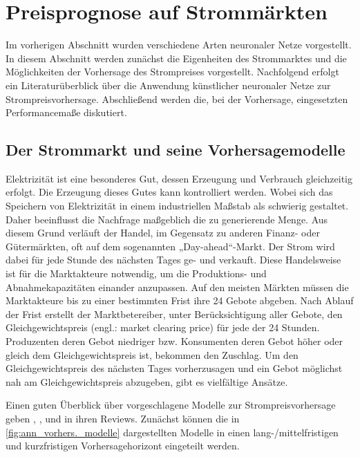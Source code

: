 

\section{Preisprognose auf Strommärkten}\label{sec:strompreis}

Im vorherigen Abschnitt wurden verschiedene Arten neuronaler Netze vorgestellt. In diesem Abschnitt werden zunächst die Eigenheiten des Strommarktes und die Möglichkeiten der Vorhersage des Strompreises vorgestellt. Nachfolgend erfolgt ein Literaturüberblick über die Anwendung künstlicher neuronaler Netze zur Strompreisvorhersage. Abschließend werden die, bei der Vorhersage, eingesetzten Performancemaße diskutiert.


\subsection{Der Strommarkt und seine Vorhersagemodelle}\label{sec:vorhersagemodelle}

Elektrizität ist eine besonderes Gut, dessen Erzeugung und Verbrauch gleichzeitig erfolgt. Die Erzeugung dieses Gutes kann kontrolliert werden. Wobei sich das Speichern von Elektrizität in einem industriellen Maßstab als schwierig gestaltet. Daher beeinflusst die Nachfrage maßgeblich die zu generierende Menge. Aus diesem Grund verläuft der Handel, im Gegensatz zu anderen Finanz- oder Gütermärkten, oft auf dem sogenannten „Day-ahead“-Markt. Der Strom wird dabei für jede Stunde des nächsten Tages ge- und verkauft. Diese Handelsweise ist für die Marktakteure notwendig, um die Produktions- und Abnahmekapazitäten einander anzupassen. Auf den meisten Märkten müssen die Marktakteure bis zu einer bestimmten Frist ihre 24 Gebote abgeben. Nach Ablauf der Frist erstellt der Marktbetereiber, unter Berücksichtigung aller Gebote, den Gleichgewichtspreis (engl.: market clearing price) für jede der 24 Stunden. Produzenten deren Gebot niedriger bzw. Konsumenten deren Gebot höher oder gleich dem Gleichgewichtspreis ist, bekommen den Zuschlag. Um den Gleichgewichtspreis des nächsten Tages vorherzusagen und ein Gebot möglichst nah am Gleichgewichtspreis abzugeben, gibt es vielfältige Ansätze.

Einen guten Überblick über vorgeschlagene Modelle zur Strompreisvorhersage geben \citet{Aggarwal2009}, \citet{Cerjan2013}, \citet{Weron2014} und \citet{Panapakidis2016} in ihren Reviews. Zunächst können die in \autoref{fig:ann_vorhers._modelle} dargestellten Modelle in einen lang-/mittelfristigen und kurzfristigen Vorhersagehorizont eingeteilt werden. 

